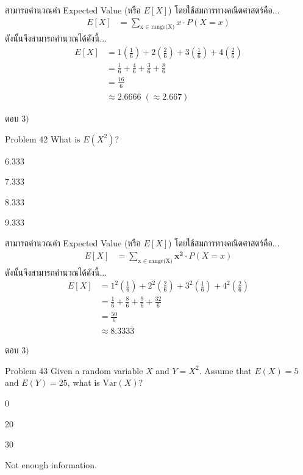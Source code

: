 \documentclass[11pt]{scrartcl}
\begin{document}
\begin{solutionbox}
  สามารถคำนวณค่า Expected Value (หรือ $E[X]$) โดยใช้สมการทางคณิตศาสตร์คือ...
  \begin{align*}
    E[X] &= \sum_{\text{x } \in \text{ range(X)}} x \cdot P(X=x)
  \end{align*}
  ดังนั้นจึงสามารถคำนวณได้ดังนี้...
  \begin{align*}
    E[X] &= 1(\frac{1}{6}) + 2(\frac{2}{6}) + 3(\frac{1}{6}) + 4(\frac{2}{6}) \\
        &= \frac{1}{6} + \frac{4}{6} + \frac{3}{6} + \frac{8}{6} \\
        &= \frac{16}{6} \\
        &\approx 2.666\overline{6} \; (\approx 2.667)
  \end{align*}

  ตอบ $\boxed{3)}$
\end{solutionbox}

\begin{problembox}{Problem 42}
What is $E(X^2)$?
 
\begin{choices}
\item 6.333
\item 7.333
\item 8.333
\item 9.333
\end{choices}
\end{problembox}

\newpage

\begin{solutionbox}
  สามารถคำนวณค่า Expected Value (หรือ $E[X]$) โดยใช้สมการทางคณิตศาสตร์คือ...
  \begin{align*}
    E[X] &= \sum_{\text{x } \in \text{ range(X)}} \boldsymbol{x^2} \cdot P(X=x)
  \end{align*}
  ดังนั้นจึงสามารถคำนวณได้ดังนี้...
  \begin{align*}
    E[X] &= 1^2(\frac{1}{6}) + 2^2(\frac{2}{6}) + 3^2(\frac{1}{6}) + 4^2(\frac{2}{6}) \\
        &= \frac{1}{6} + \frac{8}{6} + \frac{9}{6} + \frac{32}{6} \\
        &= \frac{50}{6} \\
        &\approx 8.333\overline{3}
  \end{align*}

  ตอบ $\boxed{3)}$
\end{solutionbox}

\begin{problembox}{Problem 43}
Given a random variable $X$ and $Y = X^2$. Assume that $E(X) = 5$ and $E(Y) = 25$, what is $\text{Var}(X)$?
 
\begin{choices}
\item 0
\item 20
\item 30
\item Not enough information.
\end{choices}
\end{problembox}
\end{document}
